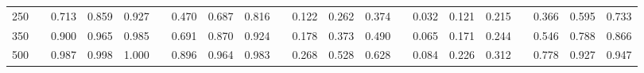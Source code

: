 % 
\begin{tabular}{ccccccccccccccccccccc}
  \hline
  \hline
250 &  & 0.713 & 0.859 & 0.927 &  & 0.470 & 0.687 & 0.816 &  & 0.122 & 0.262 & 0.374 &  & 0.032 & 0.121 & 0.215 &  & 0.366 & 0.595 & 0.733 \\ 
  350 &  & 0.900 & 0.965 & 0.985 &  & 0.691 & 0.870 & 0.924 &  & 0.178 & 0.373 & 0.490 &  & 0.065 & 0.171 & 0.244 &  & 0.546 & 0.788 & 0.866 \\ 
  500 &  & 0.987 & 0.998 & 1.000 &  & 0.896 & 0.964 & 0.983 &  & 0.268 & 0.528 & 0.628 &  & 0.084 & 0.226 & 0.312 &  & 0.778 & 0.927 & 0.947 \\ 
   \hline
\end{tabular}
